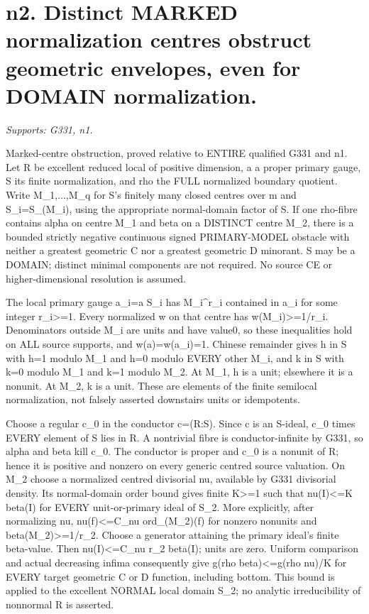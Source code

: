 \section{n2. Distinct MARKED normalization centres obstruct geometric envelopes, even for DOMAIN normalization.}
\textit{Supports: G331, n1.}

Marked-centre obstruction, proved relative to ENTIRE qualified G331 and n1. Let R be excellent reduced local of positive dimension, a a proper primary gauge, S its finite normalization, and rho the FULL normalized boundary quotient. Write M\_1,...,M\_q for S's finitely many closed centres over m and S\_i=S\_(M\_i), using the appropriate normal-domain factor of S. If one rho-fibre contains alpha on centre M\_1 and beta on a DISTINCT centre M\_2, there is a bounded strictly negative continuous signed PRIMARY-MODEL obstacle with neither a greatest geometric C nor a greatest geometric D minorant. S may be a DOMAIN; distinct minimal components are not required. No source CE or higher-dimensional resolution is assumed.

The local primary gauge a\_i=a S\_i has M\_i\textasciicircum{}r\_i contained in a\_i for some integer r\_i\textgreater{}=1. Every normalized w on that centre has w(M\_i)\textgreater{}=1/r\_i. Denominators outside M\_i are units and have value0, so these inequalities hold on ALL source supports, and w(a)=w(a\_i)=1. Chinese remainder gives h in S with h=1 modulo M\_1 and h=0 modulo EVERY other M\_i, and k in S with k=0 modulo M\_1 and k=1 modulo M\_2. At M\_1, h is a unit; elsewhere it is a nonunit. At M\_2, k is a unit. These are elements of the finite semilocal normalization, not falsely asserted downstairs units or idempotents.

Choose a regular c\_0 in the conductor c=(R:S). Since c is an S-ideal, c\_0 times EVERY element of S lies in R. A nontrivial fibre is conductor-infinite by G331, so alpha and beta kill c\_0. The conductor is proper and c\_0 is a nonunit of R; hence it is positive and nonzero on every generic centred source valuation. On M\_2 choose a normalized centred divisorial nu, available by G331 divisorial density. Its normal-domain order bound gives finite K\textgreater{}=1 such that nu(I)\textless{}=K beta(I) for EVERY unit-or-primary ideal of S\_2. More explicitly, after normalizing nu, nu(f)\textless{}=C\_nu ord\_(M\_2)(f) for nonzero nonunits and beta(M\_2)\textgreater{}=1/r\_2. Choose a generator attaining the primary ideal's finite beta-value. Then nu(I)\textless{}=C\_nu r\_2 beta(I); units are zero. Uniform comparison and actual decreasing infima consequently give g(rho beta)\textless{}=g(rho nu)/K for EVERY target geometric C or D function, including bottom. This bound is applied to the excellent NORMAL local domain S\_2; no analytic irreducibility of nonnormal R is asserted.

